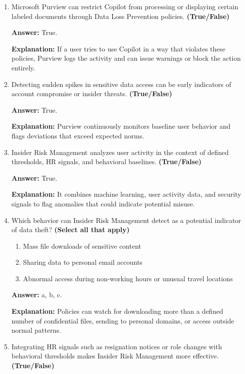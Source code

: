 \documentclass[10pt]{article}
\begin{document}
\begin{enumerate}[leftmargin=*]
\textbf{Answer:} True.

\textbf{Explanation:} Purview surfaces these activities through behavioral analytics such as detecting mass downloads from SharePoint or OneDrive.

\item Microsoft Purview can restrict Copilot from processing or displaying certain labeled documents through Data Loss Prevention policies. \textbf{(True/False)}

\textbf{Answer:} True.

\textbf{Explanation:} If a user tries to use Copilot in a way that violates these policies, Purview logs the activity and can issue warnings or block the action entirely.

\item Detecting sudden spikes in sensitive data access can be early indicators of account compromise or insider threats. \textbf{(True/False)}

\textbf{Answer:} True.

\textbf{Explanation:} Purview continuously monitors baseline user behavior and flags deviations that exceed expected norms.

\item Insider Risk Management analyzes user activity in the context of defined thresholds, HR signals, and behavioral baselines. \textbf{(True/False)}

\textbf{Answer:} True.

\textbf{Explanation:} It combines machine learning, user activity data, and security signals to flag anomalies that could indicate potential misuse.

\item Which behavior can Insider Risk Management detect as a potential indicator of data theft? \textbf{(Select all that apply)}
\begin{enumerate}[label=\alph*., leftmargin=1.5em]
\item Mass file downloads of sensitive content
\item Sharing data to personal email accounts
\item Abnormal access during non-working hours or unusual travel locations
\end{enumerate}
\textbf{Answer:} a, b, c.

\textbf{Explanation:} Policies can watch for downloading more than a defined number of confidential files, sending to personal domains, or access outside normal patterns.

\item Integrating HR signals such as resignation notices or role changes with behavioral thresholds makes Insider Risk Management more effective. \textbf{(True/False)}


\end{enumerate}
\end{document}
